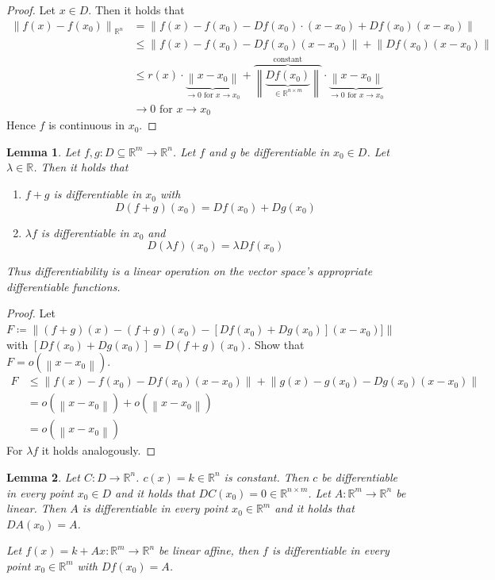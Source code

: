 \documentclass{article}
\newtheorem{lemma}{Lemma}  \numberwithin{lemma}{section}
\newcommand{\norm}[1]{\left\|#1\right\|}
\begin{document}
\begin{proof}
  Let $x \in D$. Then it holds that
  \begin{align*}
    \norm{f(x) - f(x_0)}_{\mathbb R^n}
      &= \norm{f(x) - f(x_0) - Df(x_0) \cdot (x - x_0) + Df(x_0) (x - x_0)} \\
      &\leq \norm{f(x) - f(x_0) - Df(x_0) (x - x_0)} + \norm{Df(x_0) (x - x_0)} \\
      &\leq r(x) \cdot \underbrace{\norm{x - x_0}}_{\to 0 \text{ for } x \to x_0} + \overbrace{\norm{\underbrace{Df(x_0)}_{\in \mathbb R^{n\times m}}}}^{\text{constant}} \cdot \underbrace{\norm{x - x_0}}_{\to 0 \text{ for } x \to x_0} \\
      &\to 0 \text{ for } x \to x_0
  \end{align*}
  Hence $f$ is continuous in $x_0$.
\end{proof}

\begin{lemma} %
  \label{lem5}
  Let $f,g: D \subseteq \mathbb R^m \to \mathbb R^n$. Let $f$ and $g$ be differentiable in $x_0 \in D$.
  Let $\lambda \in \mathbb R$. Then it holds that
  \begin{enumerate}
    \item $f + g$ is differentiable in $x_0$ with
      \[ D(f + g)(x_0) = Df(x_0) + Dg(x_0) \]
    \item $\lambda f$ is differentiable in $x_0$ and
      \[ D(\lambda f)(x_0) = \lambda Df(x_0) \]
  \end{enumerate}
  Thus differentiability is a linear operation on the vector space's appropriate differentiable functions.
\end{lemma}

\begin{proof}
  Let $F \coloneqq \norm{(f + g)(x) - (f + g)(x_0) - [Df(x_0) + Dg(x_0)](x - x_0)]}$
  with $[Df(x_0) + Dg(x_0)] = D(f + g)(x_0)$.
  Show that $F = o(\norm{x - x_0})$.
  \begin{align*}
    F &\leq \norm{f(x) - f(x_0) - Df(x_0)(x - x_0)} + \norm{g(x) - g(x_0) - Dg(x_0)(x - x_0)} \\
      &= o(\norm{x - x_0}) + o(\norm{x - x_0}) \\
      &= o(\norm{x - x_0})
  \end{align*}
  For $\lambda f$ it holds analogously.
\end{proof}

\begin{lemma} %
  Let $C: D \to \mathbb R^n$. $c(x) = k \in \mathbb R^n$ is constant.
  Then $c$ be differentiable in every point $x_0 \in D$ and it holds that $D C(x_0) = 0 \in \mathbb R^{n\times m}$.
  Let $A: \mathbb R^m \to \mathbb R^n$ be linear. Then $A$ is differentiable in every point $x_0 \in \mathbb R^m$ and it holds that $DA(x_0) = A$.

  Let $f(x) = k + Ax: \mathbb R^m \to \mathbb R^n$ be linear affine, then $f$ is differentiable in every point $x_0 \in \mathbb R^m$ with $Df(x_0) = A$.
\end{lemma}
\end{document}
